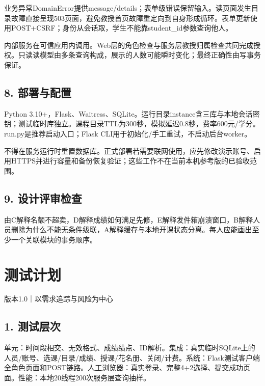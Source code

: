 \documentclass[UTF8,11pt,a4paper]{ctexart}
\begin{document}
业务异常DomainError提供message/details；表单级错误保留输入。读页面发生目录故障直接呈现503页面，避免教授首页故障重定向到自身形成循环。表单更新使用POST+CSRF；身份从会话取，学生不能靠student\_\allowbreak{}id参数查询他人。

内部服务在可信应用内调用。Web层的角色检查与服务层教授归属检查共同完成授权。只读读模型由多条查询构成，展示的人数可能瞬时变化；最终正确性由写事务保证。

\hypertarget{8-ux90e8ux7f72ux4e0eux914dux7f6e}{%
\subsection{8. 部署与配置}\label{8-ux90e8ux7f72ux4e0eux914dux7f6e}}

Python
3.10+，Flask、Waitress、SQLite。运行目录instance含三库与本地会话密钥；测试临时库独立。课程目录TTL为300秒，模拟延迟0.8秒，费率600元/学分。run.py是推荐启动入口；Flask
CLI用于初始化/手工重试，不启动后台worker。

不得在服务运行时重置数据库。正式部署若需要联网使用，应先修改演示账号、启用HTTPS并进行容量和备份恢复验证；这些工作不在当前本机参考版的已验收范围。

\hypertarget{9-ux8bbeux8ba1ux8bc4ux5ba1ux68c0ux67e5}{%
\subsection{9.
设计评审检查}\label{9-ux8bbeux8ba1ux8bc4ux5ba1ux68c0ux67e5}}

由C解释名额不超卖，D解释成绩如何满足先修，E解释发件箱崩溃窗口，B解释人员删除为什么不能无条件级联，A解释缓存与本地开课状态分离。每人应能画出至少一个关联模块的事务顺序。

\clearpage
\hypertarget{ux6d4bux8bd5ux8ba1ux5212}{%
\section{测试计划}\label{ux6d4bux8bd5ux8ba1ux5212}}

版本1.0｜以需求追踪与风险为中心

\hypertarget{1-ux6d4bux8bd5ux5c42ux6b21}{%
\subsection{1. 测试层次}\label{1-ux6d4bux8bd5ux5c42ux6b21}}

单元：时间段相交、无效格式、成绩绩点、ID解析。集成：真实临时SQLite上的人员/账号、选课/目录/成绩、授课/花名册、关闭/计费。系统：Flask测试客户端全角色页面和POST链路。人工浏览器：真实登录、完整4+2选择、提交成功页面。性能：本地20线程200次服务层查询抽样。
\end{document}
